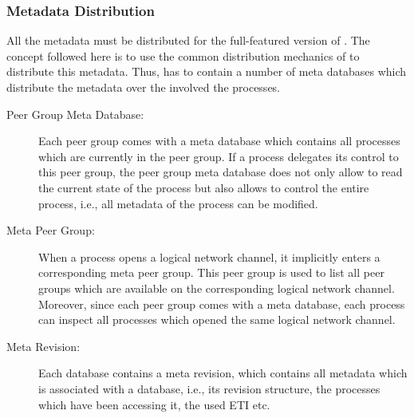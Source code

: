 \documentclass[a4paper, 10pt]{book}
\begin{document}
                                \subsubsection{Metadata Distribution}

                                All the metadata must be distributed for the full-featured version of
                                \SYNEIGHT. The concept followed here is to use the common distribution
                                mechanics of \SYNEIGHT to distribute this metadata. Thus, \SYNEIGHT has to
                                contain a number of meta databases which distribute the metadata
                                over the involved the processes. 

                                \begin{description}
                                    \item[Peer Group Meta Database:] Each peer group comes with a meta
                                        database which contains all processes which are currently in the
                                        peer group. If a process delegates its control to this peer group,
                                        the peer group meta database does not only allow to read the
                                        current state of the process but also allows to control the entire
                                        process, i.e., all metadata of the process can be modified. 
                                    \item[Meta Peer Group:] When a process opens a logical network
                                        channel, it implicitly enters a corresponding meta peer
                                        group. This peer group is used to list all peer groups which are
                                        available on the corresponding logical network channel. Moreover,
                                        since each peer group comes with a meta database, each process can
                                        inspect all processes which opened the same logical network
                                        channel. 
                                    \item[Meta Revision:] Each database contains a meta revision, which
                                        contains all metadata which is associated with a database, i.e., its
                                        revision structure, the processes which have been accessing it, the
                                        used ETI etc.
                                \end{description}
\end{document}
